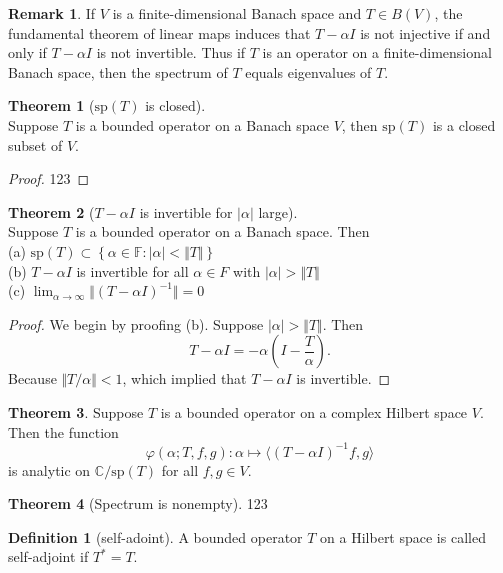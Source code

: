 \documentclass[12pt]{book}
\theoremstyle{definition}
\newtheorem{definition}{Definition}[chapter]
\newtheorem{theorem}{Theorem}[chapter]
\newtheorem{remark}{Remark}
\newcommand{\inner}[2]{{\langle #1,#2\rangle}}
\begin{document}
\begin{remark}
If $V$ is a finite-dimensional Banach space and $T \in B(V)$, the fundamental theorem of linear maps	induces that $T-\alpha I$ is not injective if and only if $T-\alpha I$ is not invertible. Thus if $T$ is an operator on a finite-dimensional Banach space, then the spectrum of $T$ equals eigenvalues of $T$.
\end{remark}


\begin{theorem}[$\mathrm{sp}(T)$ is closed] \ \\
Suppose $T$ is a bounded operator on a Banach space $V$, then $\mathrm{sp}(T)$ is a closed subset of $V$.
\begin{proof}
	123
\end{proof} 
	
\end{theorem}

\begin{theorem}[$T-\alpha I$ is invertible for $\vert \alpha \vert$ large] \ \\
Suppose $T$ is a bounded operator on a Banach space. Then \\
(a) $\mathrm{sp}(T) \subset \left\{\alpha \in \mathbb F: \vert \alpha \vert < \Vert T \Vert \right\}$ \\
(b) $T - \alpha I$ is invertible for all $\alpha \in F$ with $\vert \alpha \vert > \Vert T \Vert$ \\
(c) $\lim_{\alpha \to \infty} \Vert (T-\alpha I)^{-1}\Vert = 0$ 
\end{theorem}
\begin{proof}
We begin by proofing (b). Suppose $\vert \alpha \vert > \Vert T \Vert$. Then 
$$
T - \alpha I = -\alpha \left(I - \frac{T}{\alpha}\right).
$$
Because $\Vert T/\alpha \Vert < 1$, which implied that $T-\alpha I$ is invertible.
\end{proof}

\begin{theorem}
Suppose $T$ is a bounded operator on a complex Hilbert space $V$. Then the function 
$$
\varphi(\alpha;T,f,g): \alpha \mapsto \inner{(T-\alpha I)^{-1}f}{g}
$$	
is analytic on $\mathbb{C}/\mathrm{sp}(T)$ for all $f,g \in V$.
\end{theorem}

\begin{theorem}[Spectrum is nonempty]
123
\end{theorem}


\begin{definition}[self-adoint]
A bounded operator $T$ on a Hilbert space is called self-adjoint if $T^*=T$.	
\end{definition}
\end{document}
